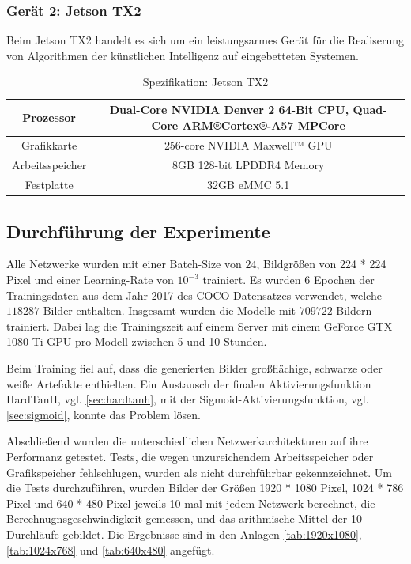 \subsubsection{Gerät 2: Jetson TX2}

Beim Jetson TX2 handelt es sich um ein leistungsarmes Gerät für die Realiserung von Algorithmen der künstlichen Intelligenz auf eingebetteten Systemen.

\begin{table}[H]
    \centering
    \begin{tabular}{ |c|c| }
        \hline
        Prozessor       & Dual-Core NVIDIA Denver 2 64-Bit CPU, Quad-Core ARM®Cortex®-A57 MPCore \\ \hline
        Grafikkarte     & 256-core NVIDIA Maxwell™ GPU \\ \hline
        Arbeitsspeicher & 8GB 128-bit LPDDR4 Memory  \\ \hline
        Festplatte      & 32GB eMMC 5.1 \\ \hline
    \end{tabular}
    \caption{Spezifikation: Jetson TX2}
    \label{tab:jetson_tx1}
\end{table}

\subsection{Durchführung der Experimente}

Alle Netzwerke wurden mit einer Batch-Size von $ 24 $, Bildgrößen von 224 * 224 Pixel und einer Learning-Rate von $ 10^{-3} $ trainiert. Es wurden 6 Epochen der Trainingsdaten aus dem Jahr 2017 des COCO-Datensatzes verwendet, welche $ 118287 $ Bilder enthalten. Insgesamt wurden die Modelle mit $ 709722 $ Bildern trainiert. Dabei lag die Trainingszeit auf einem Server mit einem GeForce GTX 1080 Ti GPU pro Modell zwischen 5 und 10 Stunden.

Beim Training fiel auf, dass die generierten Bilder großflächige, schwarze oder weiße Artefakte enthielten. Ein Austausch der finalen Aktivierungsfunktion HardTanH, vgl. \ref{sec:hardtanh}, mit der Sigmoid-Aktivierungsfunktion, vgl. \ref{sec:sigmoid}, konnte das Problem lösen.

Abschließend wurden die unterschiedlichen Netzwerkarchitekturen auf ihre Performanz getestet. Tests, die wegen unzureichendem Arbeitsspeicher oder Grafikspeicher fehlschlugen, wurden als \textcolor{danger}{nicht durchführbar} gekennzeichnet. Um die Tests durchzuführen, wurden Bilder der Größen 1920 * 1080 Pixel, 1024 * 786 Pixel und 640 * 480 Pixel jeweils 10 mal mit jedem Netzwerk berechnet, die Berechnugnsgeschwindigkeit gemessen, und das arithmische Mittel der 10 Durchläufe gebildet. Die Ergebnisse sind in den Anlagen \ref{tab:1920x1080}, \ref{tab:1024x768} und \ref{tab:640x480} angefügt.

